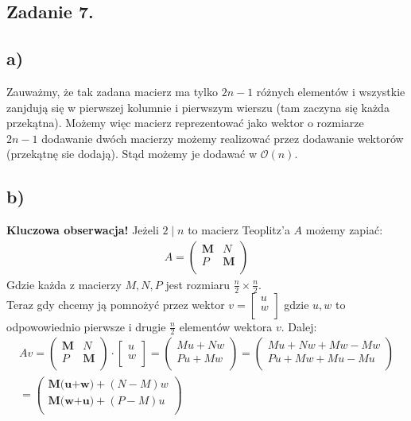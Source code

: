 \documentclass{article}
\begin{document}
\subsection*{Zadanie 7.}
\subsection*{a)}
Zauważmy, że tak zadana macierz ma tylko $2n-1$ różnych elementów i wszystkie zanjdują się w pierwszej kolumnie i pierwszym wierszu (tam zaczyna się każda przekątna). Możemy więc macierz reprezentować jako wektor o rozmiarze \\$2n-1$ dodawanie dwóch macierzy możemy realizować przez dodawanie wektorów (przekątnę sie dodają). Stąd możemy je dodawać w $\mathcal{O}(n)$.
\subsection*{b)}
\textbf{Kluczowa obserwacja!}
Jeżeli $2 \mid n$ to macierz Teoplitz'a $A$ możemy zapiać:
\begin{align*}
A =
\begin{pmatrix}
\textbf{M} & N\\
P & \textbf{M}\\
\end{pmatrix}
\end{align*}
Gdzie każda z macierzy $M,N,P$ jest rozmiaru $\frac n 2 \times \frac n 2$.\\
Teraz gdy chcemy ją pomnożyć przez wektor
$v =
\begin{bmatrix}
u\\
w\\
\end{bmatrix}
$ gdzie $u,w$ to  odpowowiednio pierwsze i drugie $\frac n 2$ elementów wektora $v$. Dalej:
\begin{align*}
Av =
\begin{pmatrix}
\textbf{M} & N\\
P & \textbf{M}\\
\end{pmatrix} \cdot
\begin{bmatrix}
u\\
w\\
\end{bmatrix}
=
\begin{pmatrix}
Mu + Nw\\
Pu + Mw\\
\end{pmatrix}
=
\begin{pmatrix}
Mu + Nw + Mw - Mw\\
Pu + Mw + Mu - Mu\\
\end{pmatrix}\\
=
\begin{pmatrix}
\textbf{M(u+w)} + (N - M)w\\
\textbf{M(w+u)} + (P-M)u\\
\end{pmatrix}
\end{align*}
\end{document}
